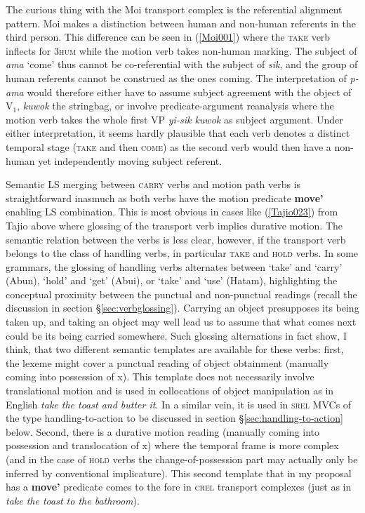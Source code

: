 The curious thing with the Moi transport complex is the referential alignment pattern. Moi makes a distinction between human and non-human referents in the third person. This difference can be seen in (\ref{Moi001}) where the \textsc{take} verb inflects for 3\textsc{hum} while the motion verb takes non-human marking. The subject of \textit{ama} `come' thus cannot be co-referential with the subject of \textit{sik}, and the group of human referents cannot be construed as the ones coming. The interpretation of \textit{p-ama} would therefore either have to assume subject agreement with the object of V$_{1}$, \textit{kuwok} the stringbag, or involve predicate-argument reanalysis where the motion verb takes the whole first VP \textit{yi-sik kuwok} as subject argument. Under either interpretation, it seems hardly plausible that each verb denotes a distinct temporal stage (\textsc{take} and then \textsc{come}) as the second verb would then have a non-human yet independently moving subject referent.

Semantic LS merging between \textsc{carry} verbs and motion path verbs is straightforward inasmuch as both verbs have the motion predicate \textbf{move'} enabling LS combination. This is most obvious in cases like (\ref{Tajio023}) from Tajio above where glossing of the transport verb implies durative motion. The semantic relation between the verbs is less clear, however, if the transport verb belongs to the class of handling verbs, in particular \textsc{take} and \textsc{hold} verbs. In some grammars, the glossing of handling verbs alternates between `take' and `carry' (Abun), `hold' and `get' (Abui), or `take' and `use' (Hatam), highlighting the conceptual proximity between the punctual and non-punctual readings (recall the discussion in section §\ref{sec:verbglossing}). Carrying an object presupposes its being taken up, and taking an object may well lead us to assume that what comes next could be its being carried somewhere. Such glossing alternations in fact show, I think, that two different semantic templates are available for these verbs: first, the lexeme might cover a punctual reading of object obtainment (manually coming into possession of x). This template does not necessarily involve translational motion and is used in collocations of object manipulation as in English \textit{take the toast and butter it}. In a similar vein, it is used in \textsc{srel} MVCs of the type handling-to-action to be discussed in section §\ref{sec:handling-to-action} below. Second, there is a durative motion reading (manually coming into possession and translocation of x) where the temporal frame is more complex (and in the case of \textsc{hold} verbs the change-of-possession part may actually only be inferred by conventional implicature). This second template that in my proposal has a \textbf{move'} predicate comes to the fore in \textsc{crel} transport complexes (just as in \textit{take the toast to the bathroom}). 

